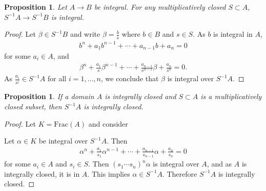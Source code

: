 \documentclass[12pt]{report}
\theoremstyle{plain}
\newtheorem{proposition}[theorem]{Proposition}
\theoremstyle{remark}
\theoremstyle{definition}
\begin{document}
\begin{proposition}
    Let $A\to B$ be integral. For any multiplicatively closed $S\subset A$, $S^{-1}A\to S^{-1}B$ is integral.
\end{proposition}
\begin{proof}
    Let $\beta\in S^{-1}B$ and write $\beta=\frac{b}{s}$ where $b\in B$ and $s\in S$. As $b$ is integral in $A$,
    \begin{align*}
        b^n+a_1b^{n-1}+\cdots+a_{n-1}b+a_n=0
    \end{align*}
    for some $a_i\in A$, and
    \begin{align*}
        \beta^n + \frac{a_1}{s}\beta^{n-1} + \cdots + \frac{a_{n-1}}{s^{n-1}}\beta + \frac{a_n}{s^n} = 0.
    \end{align*}
    As $\frac{a_i}{s^i}\in S^{-1}A$ for all $i=1,\dots,n$, we conclude that $\beta$ is integral over $S^{-1}A$.
\end{proof}

\begin{proposition}
    If a domain $A$ is integrally closed and $S\subset A$ is a multiplicatively closed subset, then $S^{-1}A$ is integrally closed.
\end{proposition}
\begin{proof}
    Let $K=\mathrm{Frac}(A)$ and consider
    \begin{figure}[H]
        \centering
    \end{figure}
    \noindent Let $\alpha\in K$ be integral over $S^{-1}A$. Then
    \begin{align*}
        \alpha^n+\frac{a_1}{s_1}\alpha^{n-1} + \cdots+\frac{a_{n-1}}{s_{n-1}}\alpha + \frac{a_n}{s_n} = 0
    \end{align*}
    for some $a_i\in A$ and $s_i\in S$. Then $(s_1\cdots s_n)^n \alpha$ is integral over $A$, and as $A$ is integrally closed, it is in $A$. This implies $\alpha\in S^{-1}A$. Therefore $S^{-1}A$ is integrally closed.
\end{proof}
\end{document}
